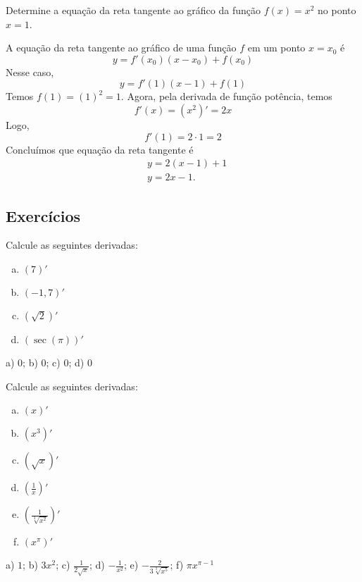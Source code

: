 \begin{exeresol}
  Determine a equação da reta tangente ao gráfico da função $f(x) = x^2$ no ponto $x=1$.
\end{exeresol}
\begin{resol}
  A equação da reta tangente ao gráfico de uma função $f$ em um ponto $x = x_0$ é
  \begin{equation}
    y = f'(x_0)(x-x_0) + f(x_0)
  \end{equation}
  Nesse caso,
  \begin{equation}
    y = f'(1)(x-1) + f(1)
  \end{equation}
  Temos $f(1) = (1)^2 = 1$. Agora, pela derivada de função potência, temos
  \begin{equation}
    f'(x) = (x^2)' = 2x
  \end{equation}
  Logo,
  \begin{equation}
    f'(1) = 2\cdot 1 = 2
  \end{equation}
  Concluímos que equação da reta tangente é
  \begin{align}
    & y = 2(x-1) + 1 \\
    & y = 2x - 1.
  \end{align}
\end{resol}

\subsection{Exercícios}

\begin{exer}
  Calcule as seguintes derivadas:
  \begin{enumerate}[a)]
  \item $(7)'$
  \item $(-1,7)'$
  \item $\left(\sqrt{2}\right)'$
  \item $\left(\sec(\pi)\right)'$
  \end{enumerate}
\end{exer}
\begin{resp}
  a) $0$; b) $0$; c) $0$; d) $0$
\end{resp}

\begin{exer}
  Calcule as seguintes derivadas:
  \begin{enumerate}[a)]
  \item $\left(x\right)'$
  \item $\left(x^3\right)'$
  \item $\left(\sqrt{x}\right)'$
  \item $\displaystyle\left(\frac{1}{x}\right)'$
  \item $\displaystyle\left(\frac{1}{\sqrt[3]{x^2}}\right)'$
  \item $\left(x^\pi\right)'$
  \end{enumerate}
\end{exer}
\begin{resp}
  a) $1$; b) $3x^2$; c) $\displaystyle\frac{1}{2\sqrt{x}}$; d) $\displaystyle -\frac{1}{x^2}$; e) $\displaystyle -\frac{2}{3\sqrt[3]{x^5}}$; f) $\pi x^{\pi - 1}$
\end{resp}

